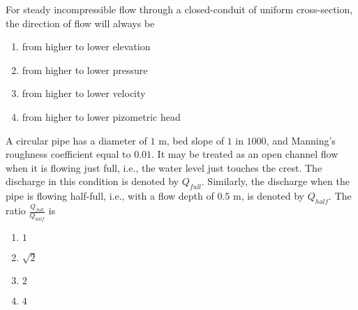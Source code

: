 \iffalse
	\title{2015-CE-27-39}
	\author{EE24Btech11006 - Arnav Mahishi}
	\section{ce}
	\chapter{2015}
\fi
\item{
For steady incompressible flow through a closed-conduit of uniform cross-section, the direction of flow will always be
\begin{multicols}{2}
\begin{enumerate}
\item from higher to lower elevation 
\item from higher to lower pressure
\item from higher to lower velocity
\item from higher to lower pizometric head
\end{enumerate}
\end{multicols}
}
\item{
A circular pipe has a diameter of $1$ m, bed slope of $1$ in $1000$, and Manning's roughness coefficient equal to $0.01$. It may be treated as an open channel flow when it is flowing just full, i.e., the water level just touches the crest. The discharge in this condition is denoted by $Q_{full}$. Similarly, the discharge when the pipe is flowing half-full, i.e., with a flow depth of $0.5$ m, is denoted by $Q_{half}$. The ratio $\frac{Q_{full}}{Q_{half}}$ is
\begin{multicols}{2}
\begin{enumerate}
\item $1$ 
\item $\sqrt{2}$
\item $2$
\item $4$
\end{enumerate}
\end{multicols}}
